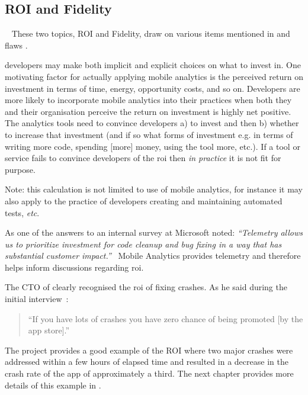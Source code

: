 \subsection{ROI and Fidelity}~\label{tata-roi-and-fidelity-topics}
These two topics, ROI and Fidelity, draw on various items mentioned in  and flaws .

 developers may make both implicit and explicit choices on what to invest in. One motivating factor for actually applying mobile analytics is the perceived return on investment in terms of time, energy, opportunity costs, and so on. Developers are more likely to incorporate mobile analytics into their practices when both they and their organisation perceive the return on investment is highly net positive. The analytics tools need to convince developers a) to invest and then b) whether to increase that investment (and if so what forms of investment e.g. in terms of writing more code, spending [more] money, using the tool more, etc.). If a tool or service fails to convince developers of the \Gls{roi} then \emph{in practice} it is not fit for purpose.

\begin{kaobox}[frametitle=ROI in software development]
Note: this calculation is not limited to use of mobile analytics, for instance it may also apply to the practice of developers creating and maintaining automated tests, \textit{etc}.

As one of the answers to an internal survey at Microsoft noted: \emph{``Telemetry allows us to prioritize investment for code cleanup and bug fixing in a way that has substantial
customer impact.''}~ Mobile Analytics provides telemetry and therefore helps inform discussions regarding \Gls{roi}. 
\end{kaobox}


The CTO of  clearly recognised the \Gls{roi} of fixing crashes. As he said during the initial interview~: 

\begin{quote}
    ``If you have lots of crashes you have zero chance of being promoted [by the app store].''
\end{quote}

The  project provides a good example of the ROI where two major crashes were addressed within a few hours of elapsed time and resulted in a decrease in the crash rate of the app of approximately a third. The next chapter provides more details of this example in .

